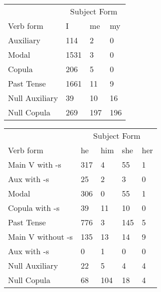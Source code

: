 \begin{table}[]
    \begin{minipage}{0.5\textwidth}
    \centering
    \begin{tabular}{@{}llll@{}}
        \toprule
            &\multicolumn{3}{c}{Subject Form}\\
            \cline{2-4}
        Verb form & I & me & my \\
        \midrule
        Auxiliary & 114 & 2 & 0 \\
        Modal & 1531 & 3 & 0 \\
        Copula & 206 & 5 & 0 \\
        Past Tense & 1661 & 11 & 9 \\
        \hline
        Null Auxiliary & 39 & 10 & 16 \\
        Null Copula & 269 & 197 & 196 \\
        \bottomrule
    \end{tabular}
\end{minipage}
\begin{minipage}{0.5\textwidth}
    \centering
    \begin{tabular}{@{}lllll@{}}
        \toprule
            &\multicolumn{4}{c}{Subject Form}\\
            \cline{2-5}
        Verb form & he & him & she & her \\
        \midrule
        Main V with -s & 317 & 4 & 55 & 1 \\
        Aux with -s & 25 & 2 & 3 & 0 \\
        Modal & 306 & 0 & 55 & 1 \\
        Copula with -s & 39 & 11 & 10 & 0 \\
        Past Tense & 776 & 3 & 145 & 5 \\
        \hline
        Main V without -s & 135 & 13 & 14 & 9 \\
        Aux with -s & 0 & 1 & 0 & 0 \\
        Null Auxiliary & 22 & 5 & 4 & 4 \\
        Null Copula & 68 & 104 & 18 & 4 \\
        \bottomrule
    \end{tabular}
\end{minipage}
\end{table}
